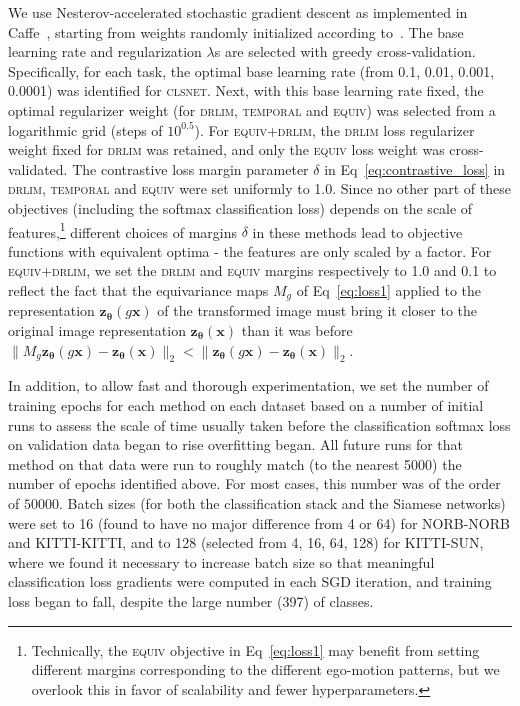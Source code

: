 \documentclass[10pt,twocolumn,letterpaper]{article}
\begin{document}
We use Nesterov-accelerated stochastic gradient descent as implemented in Caffe~\cite{caffe}, starting from weights randomly initialized according to~\cite{xavier}. The base learning rate and regularization $\lambda$s are selected with greedy cross-validation.
%
Specifically, for each task, the optimal base learning rate (from 0.1, 0.01, 0.001, 0.0001) was identified for \textsc{clsnet}. Next, with this base learning rate fixed, the optimal regularizer weight  (for \textsc{drlim}, \textsc{temporal} and \textsc{equiv}) was selected from a logarithmic grid (steps of $10^{0.5}$). For \textsc{equiv+drlim}, the \textsc{drlim} loss regularizer weight fixed for \textsc{drlim} was retained, and only the \textsc{equiv} loss weight was cross-validated.
The contrastive loss margin parameter $\delta$ in Eq~\eqref{eq:contrastive_loss}
 in \textsc{drlim}, \textsc{temporal} and \textsc{equiv} were set uniformly to 1.0.
Since no other part of these objectives (including the softmax classification loss) depends on the scale of features,\footnote{Technically, the \textsc{equiv} objective in Eq~\eqref{eq:loss1} may benefit from setting different margins corresponding to the different ego-motion patterns, but we overlook this in favor of scalability and fewer hyperparameters.} different choices of margins $\delta$ in these methods lead to objective functions with equivalent optima - the features are only scaled by a factor.
For \textsc{equiv+drlim}, we set the \textsc{drlim} and \textsc{equiv} margins respectively to 1.0 and 0.1
to reflect the fact that the equivariance maps $M_g$ of Eq~\eqref{eq:loss1} applied to the representation $\mathbf{z_{\bm{\theta}}}(g\bm{x})$ of the transformed image must bring it closer to the original image representation $\mathbf{z_{\bm{\theta}}}(\bm{x})$ than it was before \ie$\|M_g \mathbf{z_{\bm{\theta}}}(g\bm{x})- \mathbf{z_{\bm{\theta}}}(\bm{x})\|_2 < \|\mathbf{z_{\bm{\theta}}}(g\bm{x}) - \mathbf{z_{\bm{\theta}}}(\bm{x})\|_2$. %

In addition, to allow fast and thorough experimentation, we set the number of training epochs for each method on each dataset based on a number of initial runs to assess the scale of time usually taken before the classification softmax loss on validation data began to rise \ie overfitting began. All future runs for that method on that data were run to roughly match (to the nearest 5000) the number of epochs identified above. For most cases, this number was of the order of $50000$. Batch sizes (for both the classification stack and the Siamese networks) were set to 16 (found to have no major difference from 4 or 64) for NORB-NORB and KITTI-KITTI, and to 128 (selected from 4, 16, 64, 128) for KITTI-SUN, where we found it necessary to increase batch size so that meaningful classification loss gradients were computed in each SGD iteration, and training loss began to fall, despite the large number (397) of classes.
\end{document}

